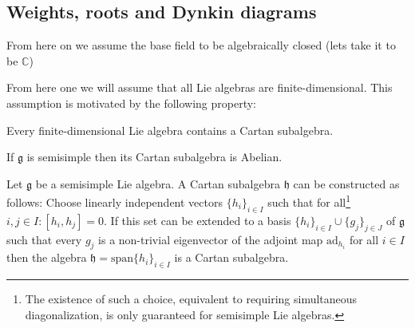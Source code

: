 \subsection{Weights, roots and Dynkin diagrams}

	From here on we assume the base field to be algebraically closed (lets take it to be $\mathbb{C}$)

	
	From here one we will assume that all Lie algebras are finite-dimensional. This assumption is motivated by the following property:
        \begin{property}
        	Every finite-dimensional Lie algebra contains a Cartan subalgebra.
        \end{property}
        \begin{property}
	       	If $\mathfrak{g}$ is semisimple then its Cartan subalgebra is Abelian.
        \end{property}

        \begin{construct}
        	Let $\mathfrak{g}$ be a semisimple Lie algebra. A Cartan subalgebra $\mathfrak{h}$ can be constructed as follows: Choose linearly independent vectors $\{h_i\}_{i\in I}$ such that for all\footnote{The existence of such a choice, equivalent to requiring simultaneous diagonalization, is only guaranteed for semisimple Lie algebras.} $i, j\in I: [h_i, h_j] = 0$. If this set can be extended to a basis $\{h_i\}_{i\in I}\cup\{g_j\}_{j\in J}$ of $\mathfrak{g}$ such that every $g_j$ is a non-trivial eigenvector of the adjoint map $\text{ad}_{h_i}$ for all $i\in I$ then the algebra $\mathfrak{h} = \text{span}\{h_i\}_{i\in I}$ is a Cartan subalgebra.
        \end{construct}

